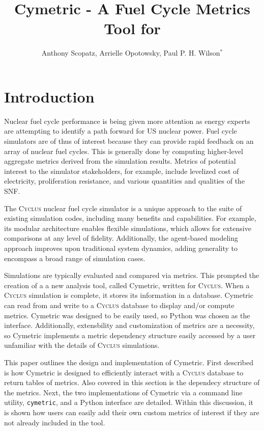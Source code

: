 \documentclass{anstrans}
\title{Cymetric - A Fuel Cycle Metrics Tool for \cyclus}
\author{Anthony Scopatz, Arrielle Opotowsky, Paul P. H. Wilson$^{*}$}
\institute{
$^{*}$Department of Engineering Physics, University of Wisconsin - Madison, 
1500 Engineering Drive, Madison WI 53703
}
\newcommand{\cyclus}{\textsc{Cyclus}\xspace}
\newcommand{\code}[1]{{\color{code}\texttt{#1}}}
\begin{document}
\section{Introduction}
Nuclear fuel cycle performance is being given more attention as energy 
experts are attempting to identify a path forward for \gls{US} nuclear power. 
Fuel cycle simulators are of thus of interest because they can provide rapid 
feedback on an array of nuclear fuel cycles. This is generally done by 
computing higher-level aggregate metrics derived from the simulation results. 
Metrics of potential interest to the simulator stakeholders, for example, 
include levelized cost of electricity, proliferation resistance, and various 
quantities and qualities of the \gls{SNF}.

The \cyclus nuclear fuel cycle simulator is a unique approach to the suite of 
existing simulation codes, including many benefits and capabilities.
For example, its modular architecture enables flexible simulations, which 
allows for extensive comparisons at any level of fidelity. Additionally, the 
agent-based modeling approach improves upon traditional system dynamics, adding 
generality to encompass a broad range of simulation cases. \cite{cyclus2015, cyclus_v1.2} 

Simulations are typically evaluated and compared via metrics. This 
prompted the creation of a a new analysis tool, called Cymetric, \cite{cymetric} written for 
\cyclus. When a \cyclus simulation is complete, it stores its information in a 
database. Cymetric can read from and write to a \cyclus database to display 
and/or compute metrics. Cymetric was designed to be easily used, so Python was 
chosen as the interface. Additionally, extensbility and customization of metrics
are a necessity, so Cymetric implements a metric dependency structure easily 
accessed by a user unfamiliar with the details of \cyclus simulations.

This paper outlines the design and implementation of Cymetric. First described 
is how Cymetric is designed to efficiently interact with a \cyclus database to 
return tables of metrics. Also covered in this section is the dependecy structure of the metrics. 
Next, the two implementations of Cymetric via a command line utility, \code{cymetric},
and a Python interface are detailed.  Within this discussion, it is shown how users can easily 
add their own custom metrics of interest if they are not already included in the
tool. 
\end{document}
